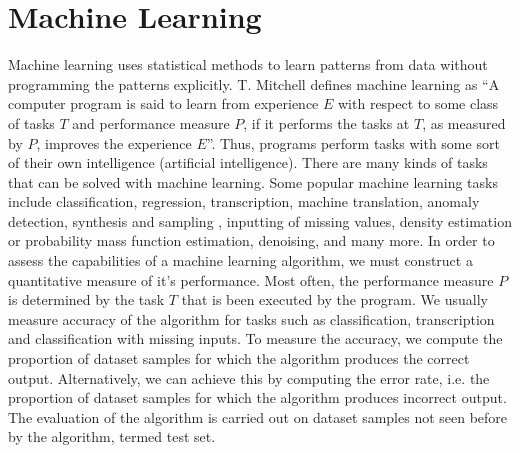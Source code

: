 \documentclass[master]{thesis-uestc}
\begin{document}
\section{Machine Learning}
Machine learning uses statistical methods to learn patterns from data without programming the patterns explicitly. T. Mitchell\cite{mitchell1997} defines machine learning as ``A computer program is said to learn from experience $E$ with respect to some class of tasks $T$ and performance measure $P$, if it performs the tasks at $T$, as measured by $P$, improves the experience $E$''. Thus, programs perform tasks with some sort of their own intelligence (artificial intelligence). There are many kinds of tasks that can be solved with machine learning. Some popular machine learning tasks include classification, regression, transcription\cite{Goodfellow-et-al-2016}, machine translation\cite{DBLP:journals/corr/AbadiABBCCCDDDG16, DBLP:journals/corr/BahdanauCB14}, anomaly detection\cite{Chandola:2009:ADS:1541880.1541882}, synthesis and sampling \cite{pmlr-v31-luo13a}, inputting of missing values, density estimation or probability mass function estimation, denoising, and many more. In order to assess the capabilities of a machine learning algorithm, we must construct a quantitative measure of it's performance. Most often, the performance measure $P$ is determined by the task $T$ that is been executed by the program. We usually measure accuracy of the algorithm for tasks such as classification, transcription and classification with missing inputs. To measure the accuracy, we compute the proportion of dataset samples for which the algorithm produces the correct output. Alternatively, we can achieve this by computing the error rate, i.e. the proportion of dataset samples for which the algorithm produces incorrect output. The evaluation of the algorithm is carried out on dataset samples not seen before by the algorithm, termed test set.
\end{document}
